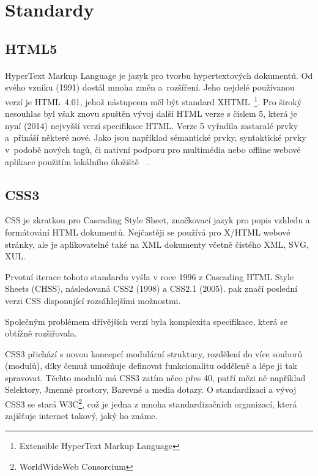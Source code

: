 \documentclass[11pt,oneside]{fithesis}
\begin{document}
        \section{Standardy}
        \subsection{HTML5}
        \paragraph*{}
        HyperText Markup Language je jazyk pro tvorbu hypertextových dokumentů. Od svého vzniku (1991) dostál mnoha změn a~rozšíření. Jeho nejdelé používanou verzí je HTML~4.01, jehož nástupcem měl být standard XHTML~\footnote{Extensible HyperText Markup Language}. Pro široký nesouhlas byl však znovu spuštěn vývoj další HTML verze s číslem 5, která je nyní (2014) nejvyšší verzí specifikace HTML. Verze 5 vyřadila zastaralé prvky a~přináší některé nové. Jako jsou například sémantické prvky, syntaktické prvky v~podobě nových tagů, či nativní podporu pro multimédia nebo offline webové aplikace použitím lokálního úložiště~\cite{html5-all}~\cite{html5-new}.

        \subsection{CSS3}
        CSS je zkratkou pro Cascading Style Sheet, značkovací jazyk pro popis vzhledu a formátování HTML dokumentů. Nejčastěji se používá pro X/HTML webové stránky, ale je aplikovatelné také na XML dokumenty včetně čistého XML, SVG, XUL. 

        Prvotní iterace tohoto standardu vyšla v roce 1996 z Cascading HTML Style Sheets (CHSS), následovaná CSS2 (1998) a CSS2.1 (2005).  pak značí poslední verzi CSS disponující rozsáhlejšími možnostmi.

        Společným problémem dřívějších verzí byla komplexita specifikace, která se obtížně rozšiřovala.

        CSS3 přichází s novou koncepcí modulární struktury, rozdělení do více souborů (modulů), díky čemuž umožňuje definovat funkcionalitu odděleně a lépe ji tak spravovat. Těchto modulů má CSS3 zatím něco přes 40, patří mězi ně například Selektory, Jmenné prostory, Barevné a media dotazy. O standardizaci a vývoj CSS3 se stará W3C\footnote{WorldWideWeb Consorcium}, což je jedna z mnoha standardizačních organizací, která zajišťuje internet takový, jaký ho známe.
\end{document}
